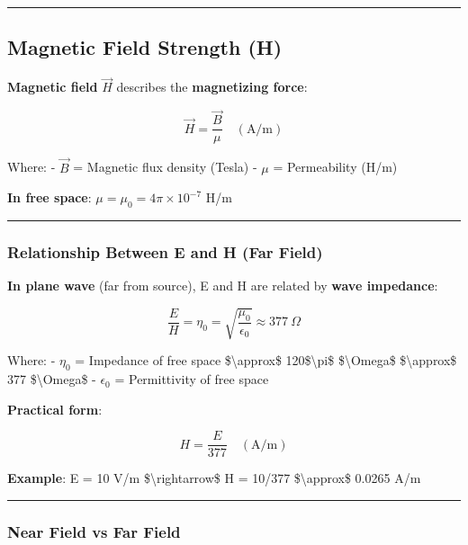 \begin{center}\rule{0.5\linewidth}{0.5pt}\end{center}

\subsection{Magnetic Field Strength
(H)}\label{magnetic-field-strength-h}

\textbf{Magnetic field} \(\vec{H}\) describes the \textbf{magnetizing
force}:

\[
\vec{H} = \frac{\vec{B}}{\mu} \quad (\text{A/m})
\]

Where: - \(\vec{B}\) = Magnetic flux density (Tesla) - \(\mu\) =
Permeability (H/m)

\textbf{In free space}: \(\mu = \mu_0 = 4\pi \times 10^{-7}\) H/m

\begin{center}\rule{0.5\linewidth}{0.5pt}\end{center}

\subsubsection{Relationship Between E and H (Far
Field)}\label{relationship-between-e-and-h-far-field}

\textbf{In plane wave} (far from source), E and H are related by
\textbf{wave impedance}:

\[
\frac{E}{H} = \eta_0 = \sqrt{\frac{\mu_0}{\epsilon_0}} \approx 377\ \Omega
\]

Where: - \(\eta_0\) = Impedance of free space \$\textbackslash approx\$
120\$\textbackslash pi\$ \$\textbackslash Omega\$
\$\textbackslash approx\$ 377 \$\textbackslash Omega\$ - \(\epsilon_0\)
= Permittivity of free space

\textbf{Practical form}:

\[
H = \frac{E}{377} \quad (\text{A/m})
\]

\textbf{Example}: E = 10 V/m \$\textbackslash rightarrow\$ H = 10/377
\$\textbackslash approx\$ 0.0265 A/m

\begin{center}\rule{0.5\linewidth}{0.5pt}\end{center}

\subsubsection{Near Field vs Far Field}\label{near-field-vs-far-field}


